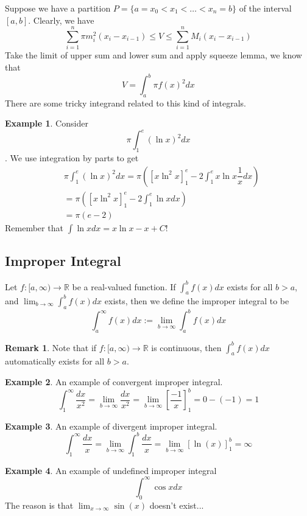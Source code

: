 \documentclass{article}
\theoremstyle{definition}
\theoremstyle{definition}
\theoremstyle{definition}
\theoremstyle{definition}
\theoremstyle{definition}
\newtheorem{remark}{Remark}
\theoremstyle{definition}
\newtheorem{example}{Example}
\theoremstyle{definition}
\theoremstyle{definition}
\theoremstyle{definition}
\newcommand{\RR}{\mathbb{R}}
\begin{document}
Suppose we have a partition $P=\{a=x_0<x_1<\ldots<x_n=b\}$ of the interval $[a,b]$.
Clearly, we have 
\[
\sum_{i=1}^n\pi m_i^2(x_{i}-x_{i-1})\le V\le \sum_{i=1}^n M_i(x_{i}-x_{i-1})   
\]
Take the limit of upper sum and lower sum and apply squeeze lemma, we know that
\[
V=\int_a^b\pi f(x)^2dx    
\]
There are some tricky integrand related to this kind of integrals. 
\begin{example}
    Consider $$\pi\int_1^e(\ln x)^2dx$$. We use integration by parts to get
    \begin{align*}
        &\pi\int_1^e(\ln x)^2dx=\pi([x\ln^2 x]_1^e-2\int_1^e x\ln x\dfrac{1}{x}dx)\\
        &=\pi([x\ln^2 x]_1^e-2\int_1^e \ln xdx)\\
        &=\pi(e-2)
    \end{align*}
    Remember that $\int\ln xdx=x\ln x-x+C$!
\end{example}

\subsection{Improper Integral}
Let $f:[a,\infty)\to\RR$ be a real-valued function. If $\int_a^b f(x)dx$ exists for all $b>a$, and $\lim_{b\to\infty}\int_a^b f(x)dx$ exists,
then we define the improper integral to be
$$\int_a^\infty f(x)dx:=\lim_{b\to\infty}\int_a^b f(x)dx$$
\begin{remark}
    Note that if $f:[a,\infty)\to\RR$ is continuous, then $\int_a^b f(x)dx$ automatically exists for all $b>a$.
\end{remark}
\begin{example}
    An example of convergent improper integral.
    \[
    \int_1^\infty\dfrac{dx}{x^2}=\lim_{b\to\infty}\dfrac{dx}{x^2}=\lim_{b\to\infty}\left[\dfrac{-1}{x}\right]_1^b=0-(-1)=1
    \]
\end{example}
\begin{example}
    An example of divergent improper integral.
    \[
    \int_1^\infty\dfrac{dx}{x}=\lim_{b\to\infty}\int_1^b\dfrac{dx}{x}=\lim_{b\to\infty}[\ln(x)]_1^b=\infty    
    \]
\end{example}
\begin{example}
    An example of undefined improper integral
    \[
    \int_0^\infty\cos xdx    
    \]
    The reason is that $\lim_{x\to\infty}\sin(x)$ doesn't exist...
\end{example}
\end{document}
